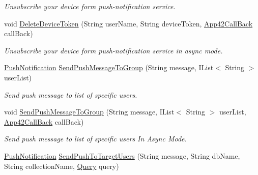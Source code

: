 \begin{DoxyCompactItemize}
\begin{DoxyCompactList}\small\item\em Unsubscribe your device form push-\/notification service. \end{DoxyCompactList}\item 
void \hyperlink{classcom_1_1shephertz_1_1app42_1_1paas_1_1sdk_1_1csharp_1_1push_notification_1_1_push_notification_service_a77699e05b9e14c1225aa8c377bbd86e9}{Delete\+Device\+Token} (String user\+Name, String device\+Token, \hyperlink{interfacecom_1_1shephertz_1_1app42_1_1paas_1_1sdk_1_1csharp_1_1_app42_call_back}{App42\+Call\+Back} call\+Back)
\begin{DoxyCompactList}\small\item\em Unsubscribe your device form push-\/notification service in async mode. \end{DoxyCompactList}\item 
\hyperlink{classcom_1_1shephertz_1_1app42_1_1paas_1_1sdk_1_1csharp_1_1push_notification_1_1_push_notification}{Push\+Notification} \hyperlink{classcom_1_1shephertz_1_1app42_1_1paas_1_1sdk_1_1csharp_1_1push_notification_1_1_push_notification_service_acf16725b2a41cc1933f29b972b3c60f6}{Send\+Push\+Message\+To\+Group} (String message, I\+List$<$ String $>$ user\+List)
\begin{DoxyCompactList}\small\item\em Send push message to list of specific users. \end{DoxyCompactList}\item 
void \hyperlink{classcom_1_1shephertz_1_1app42_1_1paas_1_1sdk_1_1csharp_1_1push_notification_1_1_push_notification_service_a454d05a656a2c194131e38218bea3581}{Send\+Push\+Message\+To\+Group} (String message, I\+List$<$ String $>$ user\+List, \hyperlink{interfacecom_1_1shephertz_1_1app42_1_1paas_1_1sdk_1_1csharp_1_1_app42_call_back}{App42\+Call\+Back} call\+Back)
\begin{DoxyCompactList}\small\item\em Send push message to list of specific users In Async Mode. \end{DoxyCompactList}\item 
\hyperlink{classcom_1_1shephertz_1_1app42_1_1paas_1_1sdk_1_1csharp_1_1push_notification_1_1_push_notification}{Push\+Notification} \hyperlink{classcom_1_1shephertz_1_1app42_1_1paas_1_1sdk_1_1csharp_1_1push_notification_1_1_push_notification_service_ae3cad912fa6816cbdd131b7966c91298}{Send\+Push\+To\+Target\+Users} (String message, String db\+Name, String collection\+Name, \hyperlink{classcom_1_1shephertz_1_1app42_1_1paas_1_1sdk_1_1csharp_1_1storage_1_1_query}{Query} query)

\end{DoxyCompactItemize}
